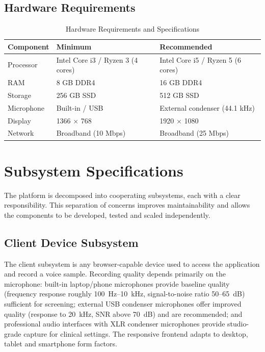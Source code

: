 \documentclass[oneside,a4paper,12pt]{report}
\begin{document}
\subsection{Hardware Requirements}
\begin{table}[H]
\centering
\caption{Hardware Requirements and Specifications}
\label{tab:hw}
\def\arraystretch{1.25}
\begin{tabularx}{\textwidth}{|X|X|X|}
\hline
\textbf{Component} & \textbf{Minimum} & \textbf{Recommended} \\ \hline
Processor & Intel Core i3 / Ryzen 3 (4 cores) & Intel Core i5 / Ryzen 5 (6 cores) \\ \hline
RAM & 8 GB DDR4 & 16 GB DDR4 \\ \hline
Storage & 256 GB SSD & 512 GB SSD \\ \hline
Microphone & Built-in / USB & External condenser (44.1 kHz) \\ \hline
Display & 1366 $\times$ 768 & 1920 $\times$ 1080 \\ \hline
Network & Broadband (10 Mbps) & Broadband (25 Mbps) \\ \hline
\end{tabularx}
\end{table}

\section{Subsystem Specifications}
The platform is decomposed into cooperating subsystems, each with a clear
responsibility. This separation of concerns improves maintainability and allows the
components to be developed, tested and scaled independently.

\subsection{Client Device Subsystem}
The client subsystem is any browser-capable device used to access the application
and record a voice sample. Recording quality depends primarily on the microphone:
built-in laptop/phone microphones provide baseline quality (frequency response
roughly 100~Hz--10~kHz, signal-to-noise ratio 50--65~dB) sufficient for screening;
external USB condenser microphones offer improved quality (response to 20~kHz,
SNR above 70~dB) and are recommended; and professional audio interfaces with XLR
condenser microphones provide studio-grade capture for clinical settings. The
responsive frontend adapts to desktop, tablet and smartphone form factors.
\end{document}
